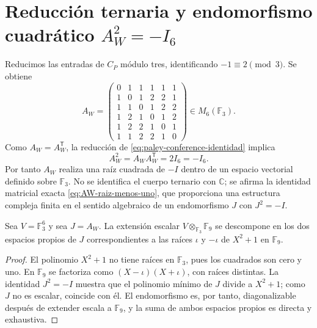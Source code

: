 \section[Reducción ternaria y estructura compleja interna]{Reducción
ternaria y endomorfismo cuadrático
\texorpdfstring{\(A_W^2=-I_6\)}{AW2=-I6}}

Reducimos las entradas de \(C_P\) módulo tres, identificando
\(-1\equiv2\pmod3\). Se obtiene
\begin{equation}
 A_W=
 \begin{pmatrix}
 0&1&1&1&1&1\\
 1&0&1&2&2&1\\
 1&1&0&1&2&2\\
 1&2&1&0&1&2\\
 1&2&2&1&0&1\\
 1&1&2&2&1&0
 \end{pmatrix}
 \in M_6(\mathbb F_3).
 \label{eq:AW-explicita}
\end{equation}
Como \(A_W=A_W^{\mathsf T}\), la reducción de
\eqref{eq:paley-conference-identidad} implica
\begin{equation}
 A_W^2=A_WA_W^{\mathsf T}=2I_6=-I_6.
 \label{eq:AW-raiz-menos-uno}
\end{equation}
Por tanto \(A_W\) realiza una raíz cuadrada de \(-I\) dentro de un espacio
vectorial definido sobre \(\mathbb F_3\). No se identifica el cuerpo ternario
con \(\mathbb C\); se afirma la identidad matricial exacta
\eqref{eq:AW-raiz-menos-uno}, que proporciona una estructura compleja finita
en el sentido algebraico de un endomorfismo \(J\) con \(J^2=-I\).

\begin{proposition}
Sea \(V=\mathbb F_3^6\) y sea \(J=A_W\). La extensión escalar
\(V\otimes_{\mathbb F_3}\mathbb F_9\) se descompone en los dos espacios
propios de \(J\) correspondientes a las raíces \(\iota\) y \(-\iota\) de
\(X^2+1\) en \(\mathbb F_9\).
\end{proposition}

\begin{proof}
El polinomio \(X^2+1\) no tiene raíces en \(\mathbb F_3\), pues los
cuadrados son cero y uno. En \(\mathbb F_9\) se factoriza como
\((X-\iota)(X+\iota)\), con raíces distintas. La identidad \(J^2=-I\)
muestra que el polinomio mínimo de \(J\) divide a \(X^2+1\); como \(J\) no
es escalar, coincide con él. El endomorfismo es, por tanto, diagonalizable
después de extender escala a \(\mathbb F_9\), y la suma de ambos espacios
propios es directa y exhaustiva.
\end{proof}

